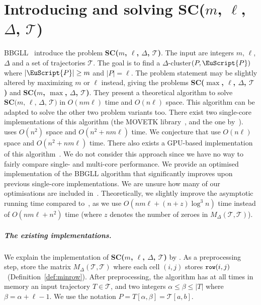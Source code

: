 \documentclass[11pt]{article}
\newcommand{\fancy}[1]{\EuScript{#1}}
\newcommand{\minrow}{\texttt{\small row}}
\newcommand{\pathlet}{cluster\xspace}
\begin{document}
\section{\texorpdfstring{Introducing and solving SC($m$, $\ell$, $\Delta$, $\mathcal{T}$)}{Introducing and solving SC(m, l, D, T)} }
\label{sec:BBGLL}
%
BBGLL~\cite{buchin2011detecting} introduce the problem \textbf{SC($m$, $\ell$, $\Delta$, $\mathcal{T}$)}.
The input are integers $m$, $\ell$, $\Delta$ and a set of trajectories $\mathcal{T}$.  The goal is to find a $\Delta$-\pathlet $(P, {\fancy{P}})$ where $|{\fancy{P}}| \geq m$ and $|P| = \ell$.  
The problem statement may be slightly altered by maximizing $m$ or $\ell$ instead, giving the problems \textbf{SC($\max$, $\ell$, $\Delta$, $\mathcal{T}$)} and \textbf{SC($m$, $\max$, $\Delta$, $\mathcal{T}$)}.
They present a theoretical algorithm to solve $\textbf{SC($m$, $\ell$, $\Delta$, $\mathcal{T}$)}$ in $O(n m \ell)$ time and $O(n \ell)$ space.
This algorithm can be adapted to solve the other two problem variants too. 
%
%
There exist two single-core implementations of this algorithm (the MOVETK library~\cite{movetk}, and the one by~\cite{buchin2017clustering, buchin2020improved}). 
\cite{movetk} uses $O(n^2)$ space and $O(n^2 + n m \ell)$ time.
We conjecture that \cite{buchin2017clustering, buchin2020improved} use $O(n \ell)$ space and $O(n^2 + n m \ell)$ time.
There also exists a GPU-based implementation of this algorithm~\cite{gudmundsson2012gpu}. We do not consider this approach since we have no way to fairly compare single- and multi-core performance.
We provide an optimised implementation of the BBGLL algorithm that significantly improves upon previous single-core implementations. We are unsure how many of our optimisations are included in~\cite{buchin2017clustering, buchin2020improved}. Theoretically, we slightly improve the asymptotic running time compared to~\cite{buchin2011detecting}, as we use $O( n m \ell + (n + z) \log^3 n)$ time instead of $O(n m \ell + n^2)$ time (where $z$ denotes the number of zeroes in $M_\Delta(\mathcal{T}, \mathcal{T})$). 
%
%
%
\subparagraph{The existing implementations.}
We explain the implementation of \textbf{SC($m$, $\ell$, $\Delta$, $\mathcal{T}$)} by \cite{movetk}. 
As a preprocessing step, store the matrix $M_\Delta(\mathcal{T}, \mathcal{T})$ where each cell $(i, j)$ stores $\minrow(i, j)$ ~(Definition~\ref{def:minrow}).
After preprocessing, the algorithm has at all times in memory an input trajectory $T \in \mathcal{T}$, and two integers $\alpha \leq \beta \leq |T|$ where $\beta = \alpha  + \ell - 1$. We use the notation $P = T[\alpha, \beta] = \mathcal{T}[a, b]$. 
\end{document}
